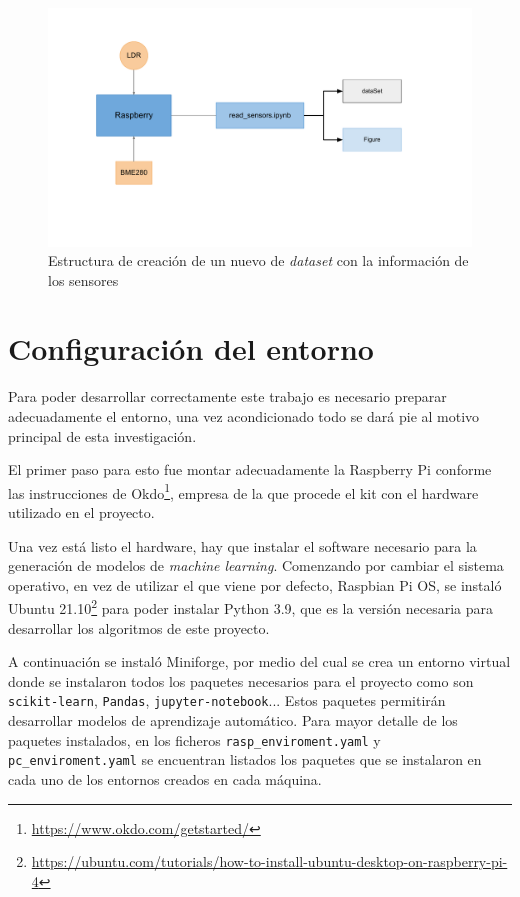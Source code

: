 \documentclass[a4paper, 12pt]{book}
\begin{document}
\begin{figure}[htb]
  \centering
  \includegraphics[width=15cm, keepaspectratio]{img/esquema_sensores.pdf}
  \caption{Estructura de creación de un nuevo de \textit{dataset} con la información de los sensores}\label{fig:esquema_sensores}
\end{figure}


\section{Configuración del entorno}
\label{sec:configuracion_entorno}

Para poder desarrollar correctamente este trabajo es necesario preparar adecuadamente el entorno, una vez acondicionado todo se dará pie al motivo principal de esta investigación.

El primer paso para esto fue montar adecuadamente la Raspberry Pi conforme las instrucciones de Okdo\footnote{\url{https://www.okdo.com/getstarted/}}, empresa de la que procede el kit con el hardware utilizado en el proyecto.

Una vez está listo el hardware, hay que instalar el software necesario para la generación de modelos de \textit{machine learning}.
Comenzando por cambiar el sistema operativo, en vez de utilizar el que viene por defecto, Raspbian Pi OS, se instaló Ubuntu 21.10\footnote{\url{https://ubuntu.com/tutorials/how-to-install-ubuntu-desktop-on-raspberry-pi-4}} para poder instalar Python 3.9, que es la versión necesaria para desarrollar los algoritmos de este proyecto.

A continuación se instaló Miniforge, por medio del cual se crea un entorno virtual donde se instalaron todos los paquetes necesarios para el proyecto como son \texttt{scikit-learn}, \texttt{Pandas}, \texttt{jupyter-notebook}... Estos paquetes permitirán desarrollar modelos de aprendizaje automático. Para mayor detalle de los paquetes instalados, en los ficheros \texttt{rasp\_enviroment.yaml} y \texttt{pc\_enviroment.yaml} se encuentran listados los paquetes que se instalaron en cada uno de los entornos creados en cada máquina.
\end{document}
